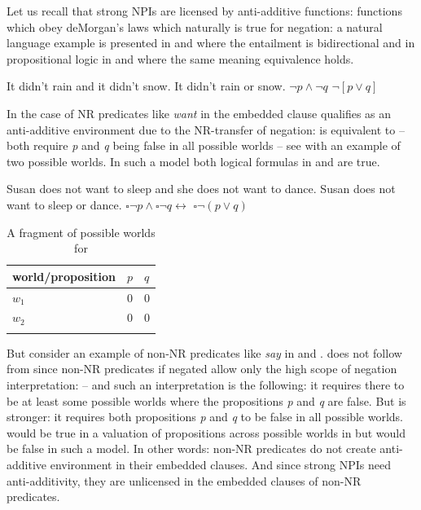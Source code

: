 \documentclass[output=paper,
]{langscibook}
\begin{document}
\noindent Let us recall that strong NPIs are licensed by anti-additive functions: functions which obey deMorgan's laws which naturally is true for negation: a natural language example is presented in  and  where the entailment is bidirectional and in propositional logic in  and  where the same meaning equivalence holds.

\ea \ea\label{ex-29-a} It didn't rain and it didn't snow.
\ex \label{ex-29-b} It didn't rain or snow.
\ex \label{ex-29-c} $\neg p \wedge \neg q$
\ex \label{ex-29-d} $\neg[p \vee q]$
\z
\z

\noindent In the case of NR predicates like \textit{want} in  the embedded clause qualifies as an anti-additive environment due to the NR-transfer of negation:  is equivalent to  -- both require \textit{p} and \textit{q} being false in all possible worlds -- see  with an example of two possible worlds. In such a model both logical formulas in  and  are true.

\ea \label{ex-30}\ea \label{ex-30-a} Susan does not want to sleep and she does not want to dance.
\ex \label{ex-30-b} Susan does not want to sleep or dance.
\ex \label{ex-30-c} $\square \neg p \wedge \square \neg q \leftrightarrow$
\ex \label{ex-30-d} $\square \neg(p \vee q)$
\z
\z

\begin{table}
\begin{tabularx}{0.4\textwidth}{lXX}
\lsptoprule
world/proposition & $p$ & $q$\tabularnewline
\midrule
$w_1$ & 0 & 0\tabularnewline
$w_2$ & 0 & 0\tabularnewline
\lspbottomrule
\end{tabularx}
\caption{A fragment of possible worlds for }
     \label{tab:table4_w1_w2}
\end{table}


\noindent But consider an example of non-NR predicates like \textit{say} in  and .  does not follow from   since non-NR predicates if negated allow only the high scope of negation interpretation:  -- and such an interpretation is the following: it requires there to be at least some possible worlds where the propositions \textit{p} and \textit{q} are false. But  is stronger: it requires both propositions \textit{p} and \textit{q} to be false in all possible worlds.  would be true in a valuation of propositions across possible worlds in  but  would be false in such a model. In other words: non-NR predicates do not create anti-additive environment in their embedded clauses. And since strong NPIs need anti-additivity, they are unlicensed in the embedded clauses of non-NR predicates.
\end{document}
